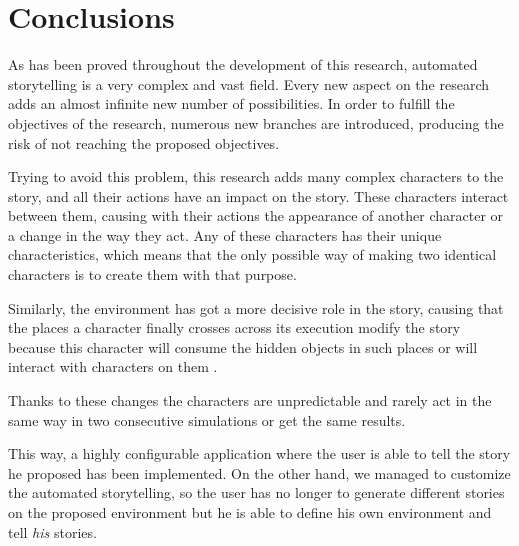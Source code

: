 %
%
\chapter*{Conclusions}

\begin{FraseCelebre}
\begin{Frase}
\end{Frase}
\begin{Fuente}
\end{Fuente}
\end{FraseCelebre}

\label{cap32:sec:Conclusions}

As has been proved throughout the development of this research, automated storytelling is a very complex and vast field. Every new aspect on the research adds an almost infinite new number of possibilities. In order to fulfill the objectives of the research, numerous new branches are introduced, producing the risk of not reaching the proposed objectives.


Trying to avoid this problem, this research adds many complex characters to the story, and all their actions have an impact on the story. These characters interact between them, causing with their actions the appearance of another character or a change in the way they act. Any of these characters has their unique characteristics, which means that the only possible way of making two identical characters is to create them with that purpose.


Similarly, the environment has got a more decisive role in the story, causing that the places a character finally crosses across its execution modify the story because this character will consume the hidden objects in such places or will interact with characters on them .



Thanks to these changes the characters are unpredictable and rarely act in the same way in two consecutive simulations or get the same results.


This way, a highly configurable application where the user is able to tell the story he proposed has been implemented.
On the other hand, we managed to customize the automated storytelling, so the user has no longer to generate different stories on the proposed environment but he is able to define his own environment and tell \emph{his} stories.


